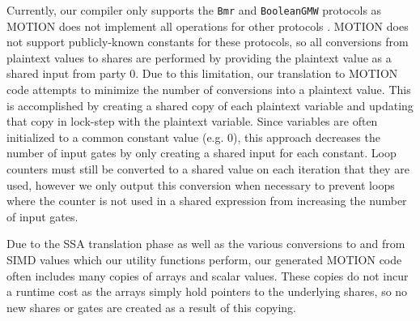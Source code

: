 Currently, our compiler only supports the \texttt{Bmr} and \texttt{BooleanGMW} protocols as MOTION does not implement all operations for other protocols .  MOTION does not support publicly-known constants for these protocols, so all conversions from plaintext values to shares are performed by providing the plaintext value as a shared input from party 0.  Due to this limitation, our translation to MOTION code attempts to minimize the number of conversions into a plaintext value.  This is accomplished by creating a shared copy of each plaintext variable and updating that copy in lock-step with the plaintext variable.  Since variables are often initialized to a common constant value (e.g. 0), this approach decreases the number of input gates by only creating a shared input for each constant.  Loop counters must still be converted to a shared value on each iteration that they are used, however we only output this conversion when necessary to prevent loops where the counter is not used in a shared expression from increasing the number of input gates.

Due to the SSA translation phase as well as the various conversions to and from SIMD values which our utility functions perform, our generated MOTION code often includes many copies of arrays and scalar values.  These copies do not incur a runtime cost as the arrays simply hold pointers to the underlying shares, so no new shares or gates are created as a result of this copying. 